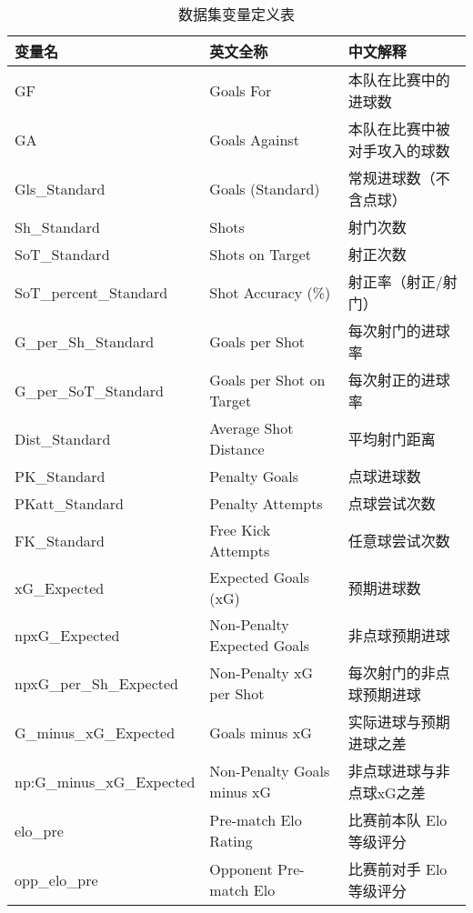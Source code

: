 \documentclass[
]{ctexart}
\begin{document}
\begin{table}

\caption{数据集变量定义表}
\centering
\begin{tabular}[t]{lll}
\toprule
变量名 & 英文全称 & 中文解释\\
\midrule
GF & Goals For & 本队在比赛中的进球数\\
GA & Goals Against & 本队在比赛中被对手攻入的球数\\
Gls\_Standard & Goals (Standard) & 常规进球数（不含点球）\\
Sh\_Standard & Shots & 射门次数\\
SoT\_Standard & Shots on Target & 射正次数\\
\addlinespace
SoT\_percent\_Standard & Shot Accuracy (\%) & 射正率（射正/射门）\\
G\_per\_Sh\_Standard & Goals per Shot & 每次射门的进球率\\
G\_per\_SoT\_Standard & Goals per Shot on Target & 每次射正的进球率\\
Dist\_Standard & Average Shot Distance & 平均射门距离\\
PK\_Standard & Penalty Goals & 点球进球数\\
\addlinespace
PKatt\_Standard & Penalty Attempts & 点球尝试次数\\
FK\_Standard & Free Kick Attempts & 任意球尝试次数\\
xG\_Expected & Expected Goals (xG) & 预期进球数\\
npxG\_Expected & Non-Penalty Expected Goals & 非点球预期进球\\
npxG\_per\_Sh\_Expected & Non-Penalty xG per Shot & 每次射门的非点球预期进球\\
\addlinespace
G\_minus\_xG\_Expected & Goals minus xG & 实际进球与预期进球之差\\
np:G\_minus\_xG\_Expected & Non-Penalty Goals minus xG & 非点球进球与非点球xG之差\\
elo\_pre & Pre-match Elo Rating & 比赛前本队 Elo 等级评分\\
opp\_elo\_pre & Opponent Pre-match Elo & 比赛前对手 Elo 等级评分\\
\bottomrule
\end{tabular}
\end{table}
\end{document}
